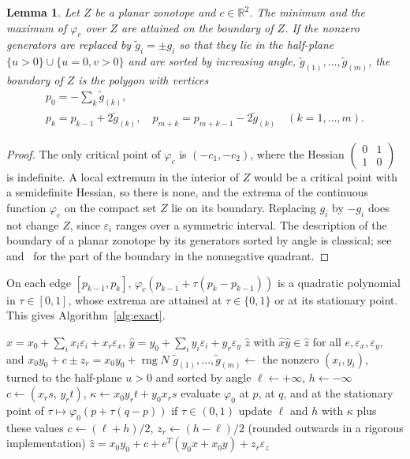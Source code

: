 \documentclass[10pt]{article}
\newtheorem{lemma}[theorem]{Lemma}
\theoremstyle{definition}
\newcommand{\R}{\mathbb{R}}
\newcommand{\eps}{\varepsilon}
\newcommand{\ex}{\eps_x}
\newcommand{\ey}{\eps_y}
\newcommand{\rng}{\operatorname{rng}}
\begin{document}
\begin{lemma}
\label{lem:zonotope}
Let $Z$ be a planar zonotope and $c\in\R^2$. The minimum and the maximum of $\varphi_c$ over $Z$ are attained on the boundary of $Z$. If the nonzero generators are replaced by $\tilde g_i=\pm g_i$ so that they lie in the half-plane $\{u>0\}\cup\{u=0,v>0\}$ and are sorted by increasing angle, $\tilde g_{(1)},\dots,\tilde g_{(m)}$, the boundary of $Z$ is the polygon with vertices
\begin{equation}
\label{eq:boundary}
\begin{gathered}p_0=-\sum_k\tilde g_{(k)},\\ p_k = p_{k-1}+2\tilde g_{(k)},\quad p_{m+k} = p_{m+k-1}-2\tilde g_{(k)}\quad (k=1,\dots,m).\end{gathered}
\end{equation}
\end{lemma}
\begin{proof}
The only critical point of $\varphi_c$ is $(-c_1,-c_2)$, where the Hessian $\left(\begin{smallmatrix}0&1\\1&0\end{smallmatrix}\right)$ is indefinite. A local extremum in the interior of $Z$ would be a critical point with a semidefinite Hessian, so there is none, and the extrema of the continuous function $\varphi_c$ on the compact set $Z$ lie on its boundary. Replacing $g_i$ by $-g_i$ does not change $Z$, since $\eps_i$ ranges over a symmetric interval. The description of the boundary of a planar zonotope by its generators sorted by angle is classical; see~\cite{ziegler1995lectures} and~\cite[Prop.~7]{skalna2017new} for the part of the boundary in the nonnegative quadrant.
\end{proof}

On each edge $[p_{k-1},p_k]$, $\varphi_c(p_{k-1}+\tau(p_k-p_{k-1}))$ is a quadratic polynomial in $\tau\in[0,1]$, whose extrema are attained at $\tau\in\{0,1\}$ or at its stationary point. This gives Algorithm~\ref{alg:exact}.

\begin{algorithm}[H]
\caption{Exact multiplication of reduced affine forms}
\label{alg:exact}
\begin{algorithmic}[1]
\Require $\hat x = x_0+\sum_ix_i\eps_i+x_r\ex$, $\hat y = y_0+\sum_iy_i\eps_i+y_r\ey$
\Ensure $\hat z$ with $\hat x\hat y\in\hat z$ for all $e,\ex,\ey$, and $x_0y_0+c\pm z_r = x_0y_0+\rng N$
\State $\tilde g_{(1)},\dots,\tilde g_{(m)}\gets$ the nonzero $(x_i,y_i)$, turned to the half-plane $u>0$ and sorted by angle
\State $\ell\gets+\infty$, $h\gets-\infty$
  \State $c\gets(x_rs,\,y_rt)$, $\kappa\gets x_0y_rt+y_0x_rs$
    \State evaluate $\varphi_0$ at $p$, at $q$, and at the stationary point of $\tau\mapsto\varphi_0(p+\tau(q-p))$ if $\tau\in(0,1)$
    \State update $\ell$ and $h$ with $\kappa$ plus these values
  \EndFor
\EndFor
\State $c\gets(\ell+h)/2$, $z_r\gets(h-\ell)/2$ (rounded outwards in a rigorous implementation)
\State \Return $\hat z = x_0y_0+c+e^T(y_0x+x_0y)+z_r\eps_z$
\end{algorithmic}
\end{algorithm}
\end{document}
